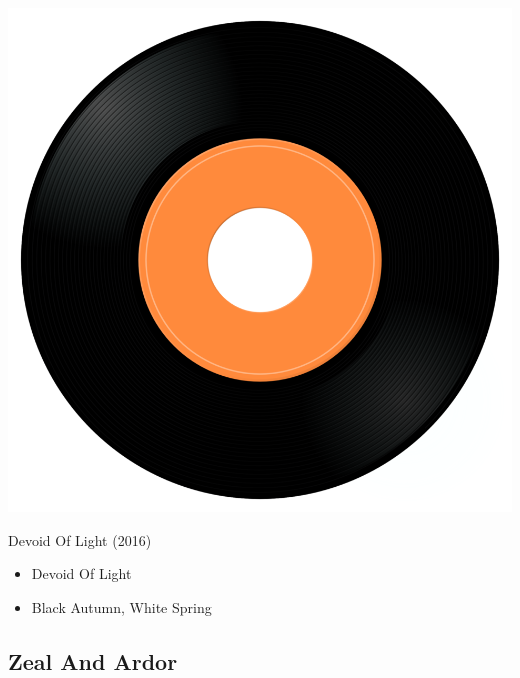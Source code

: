 \begin{minipage}[t]{0.25\textwidth}
\captionsetup{type=figure}
\includegraphics[width=\textwidth]{Images/cover.png}
\caption*{Devoid Of Light (2016)}
\end{minipage}
\begin{minipage}[t]{0.25\textwidth}\vspace{0pt}
\begin{itemize}[nosep,leftmargin=1em,labelwidth=*,align=left]
	\setlength{\itemsep}{0pt}
	\item Devoid Of Light
	\item Black Autumn, White Spring
\end{itemize}
\end{minipage}

\subsection{Zeal And Ardor}

